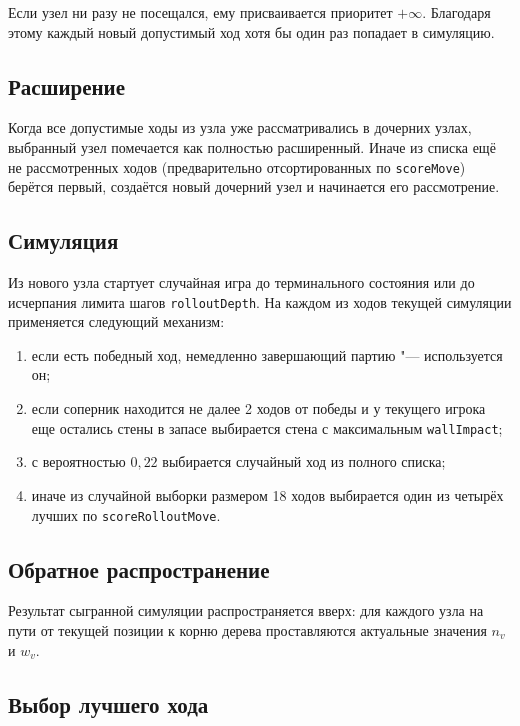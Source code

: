 \documentclass[a4paper,12pt]{diplom}
\begin{document}
Если узел ни разу не посещался, ему присваивается приоритет $+\infty$. Благодаря этому каждый новый допустимый ход хотя бы один раз попадает в симуляцию.

\subsection{Расширение}

Когда все допустимые ходы из узла уже рассматривались в дочерних узлах, выбранный узел помечается как полностью расширенный. Иначе из списка ещё не рассмотренных ходов (предварительно отсортированных по \texttt{scoreMove}) берётся первый, создаётся новый дочерний узел и начинается его рассмотрение.

\subsection{Симуляция}

Из нового узла стартует случайная игра до терминального состояния или до исчерпания лимита шагов \texttt{rolloutDepth}. На каждом из ходов текущей симуляции применяется следующий механизм:

\begin{enumerate}
\item если есть победный ход, немедленно завершающий партию "--- используется он;
\item если соперник находится не далее 2 ходов от победы и у текущего игрока еще остались стены в запасе выбирается стена с максимальным \texttt{wallImpact};
\item с вероятностью $0{,}22$ выбирается случайный ход из полного списка;
\item иначе из случайной выборки размером 18 ходов выбирается один из четырёх лучших по \texttt{scoreRolloutMove}.
\end{enumerate}

\subsection{Обратное распространение}

Результат сыгранной симуляции распространяется вверх: для каждого узла на пути от текущей позиции к корню дерева проставляются актуальные значения $n_v$ и $w_v$.

\subsection{Выбор лучшего хода}
\end{document}
